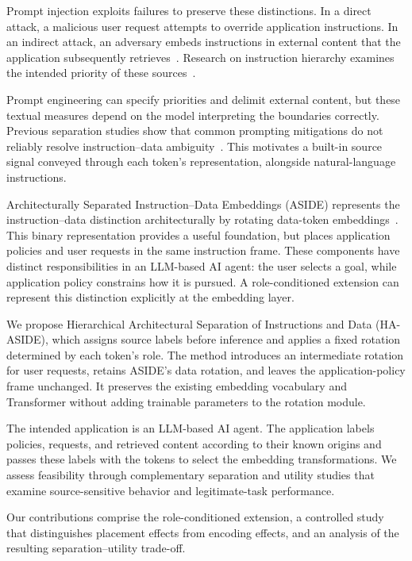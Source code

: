 \documentclass[conference,letterpaper,10pt]{IEEEtran}
\begin{document}
Prompt injection exploits failures to preserve these distinctions. In a direct
attack, a malicious user request attempts to override application
instructions. In an indirect attack, an adversary embeds instructions in
external content that the application subsequently
retrieves~\cite{deng2025agents}. Research on instruction hierarchy examines
the intended priority of these sources~\cite{wu2025ise}.

Prompt engineering can specify priorities and delimit external content, but
these textual measures depend on the model interpreting the boundaries
correctly. Previous separation studies show that common prompting mitigations
do not reliably resolve instruction--data ambiguity~\cite{zverev2025sep}. This
motivates a built-in source signal conveyed through each token's
representation, alongside natural-language instructions.

Architecturally Separated Instruction--Data Embeddings (ASIDE) represents the
instruction--data distinction architecturally by rotating
data-token embeddings~\cite{zverev2026aside}. This binary representation
provides a useful foundation, but places application policies and user
requests in the same instruction frame. These components have distinct
responsibilities in an LLM-based AI agent: the user selects a goal, while
application policy constrains how it is pursued. A role-conditioned extension
can represent this distinction explicitly at the embedding layer.

We propose Hierarchical Architectural Separation of Instructions and Data
(HA-ASIDE), which assigns source labels before inference and applies
a fixed rotation determined by each token's role. The method introduces an
intermediate rotation for user requests, retains ASIDE's data rotation, and
leaves the application-policy frame unchanged. It preserves the existing
embedding vocabulary and Transformer without adding trainable parameters to
the rotation module.

The intended application is an LLM-based AI agent. The application labels
policies, requests, and retrieved content according to their known origins and
passes these labels with the tokens to select the embedding transformations.
We assess feasibility through complementary separation and utility studies
that examine source-sensitive behavior and legitimate-task performance.

Our contributions comprise the role-conditioned extension, a controlled study
that distinguishes placement effects from encoding effects, and an analysis of
the resulting separation--utility trade-off.
\end{document}
